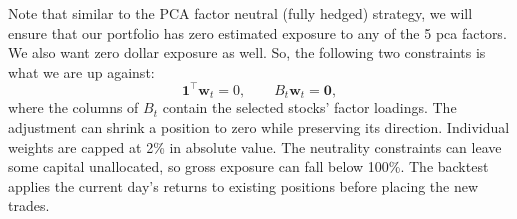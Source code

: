 \documentclass[12pt,letterpaper]{article}
\begin{document}
Note that similar to the PCA factor neutral (fully hedged) strategy, we will ensure that our portfolio has zero estimated exposure to any of the 5 pca factors. We also want zero dollar exposure as well. So, the following two constraints is what we are up against: 
\[
    \mathbf{1}^{\top}\mathbf{w}_t=0,
    \qquad B_t\mathbf{w}_t=\mathbf{0},
\]
where the columns of $B_t$ contain the selected stocks' factor
loadings. The adjustment can shrink a position to zero while
preserving its direction. Individual weights are capped at 2\%
in absolute value. The neutrality constraints can leave some
capital unallocated, so gross exposure can fall below 100\%.
The backtest applies the current day's returns to existing
positions before placing the new trades.
\end{document}
